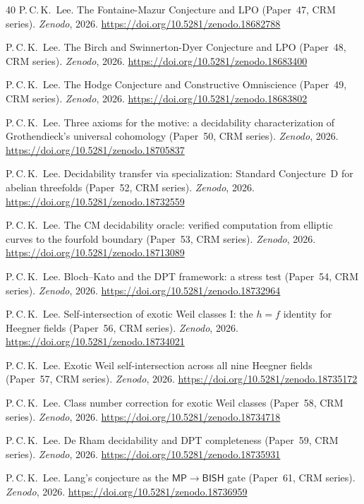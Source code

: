 \documentclass[11pt]{article}
\theoremstyle{plain}
\theoremstyle{definition}
\theoremstyle{remark}
\newcommand{\BISH}{\mathsf{BISH}}
\newcommand{\MP}{\mathsf{MP}}
\begin{document}
\begin{thebibliography}{40}
P.\,C.\,K.~Lee.
The Fontaine-Mazur Conjecture and LPO
(Paper~47, CRM series).
\textit{Zenodo}, 2026.
\url{https://doi.org/10.5281/zenodo.18682788}

P.\,C.\,K.~Lee.
The Birch and Swinnerton-Dyer Conjecture and LPO
(Paper~48, CRM series).
\textit{Zenodo}, 2026.
\url{https://doi.org/10.5281/zenodo.18683400}

P.\,C.\,K.~Lee.
The Hodge Conjecture and Constructive Omniscience
(Paper~49, CRM series).
\textit{Zenodo}, 2026.
\url{https://doi.org/10.5281/zenodo.18683802}

P.\,C.\,K.~Lee.
Three axioms for the motive: a decidability characterization
of Grothendieck's universal cohomology
(Paper~50, CRM series).
\textit{Zenodo}, 2026.
\url{https://doi.org/10.5281/zenodo.18705837}

P.\,C.\,K.~Lee.
Decidability transfer via specialization: Standard Conjecture~D
for abelian threefolds
(Paper~52, CRM series).
\textit{Zenodo}, 2026.
\url{https://doi.org/10.5281/zenodo.18732559}

P.\,C.\,K.~Lee.
The CM decidability oracle: verified computation from elliptic
curves to the fourfold boundary
(Paper~53, CRM series).
\textit{Zenodo}, 2026.
\url{https://doi.org/10.5281/zenodo.18713089}

P.\,C.\,K.~Lee.
Bloch--Kato and the DPT framework: a stress test
(Paper~54, CRM series).
\textit{Zenodo}, 2026.
\url{https://doi.org/10.5281/zenodo.18732964}

P.\,C.\,K.~Lee.
Self-intersection of exotic Weil classes I:
the $h = f$ identity for Heegner fields
(Paper~56, CRM series).
\textit{Zenodo}, 2026.
\url{https://doi.org/10.5281/zenodo.18734021}

P.\,C.\,K.~Lee.
Exotic Weil self-intersection across all nine Heegner fields
(Paper~57, CRM series).
\textit{Zenodo}, 2026.
\url{https://doi.org/10.5281/zenodo.18735172}

P.\,C.\,K.~Lee.
Class number correction for exotic Weil classes
(Paper~58, CRM series).
\textit{Zenodo}, 2026.
\url{https://doi.org/10.5281/zenodo.18734718}

P.\,C.\,K.~Lee.
De Rham decidability and DPT completeness
(Paper~59, CRM series).
\textit{Zenodo}, 2026.
\url{https://doi.org/10.5281/zenodo.18735931}

P.\,C.\,K.~Lee.
Lang's conjecture as the $\MP \to \BISH$ gate
(Paper~61, CRM series).
\textit{Zenodo}, 2026.
\url{https://doi.org/10.5281/zenodo.18736959}


\end{thebibliography}
\end{document}
